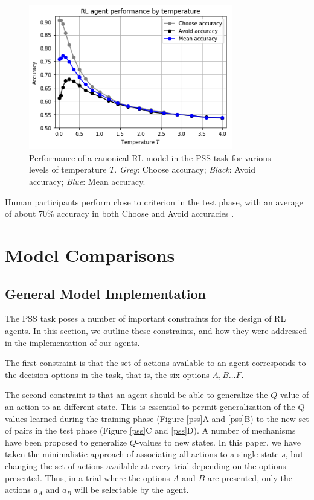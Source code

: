 \documentclass[10pt,letterpaper]{article}
\begin{document}
\begin{figure}[ht]
	\begin{center}
		\includegraphics[width=3.5in]{rl-performance.png}
	\end{center}
	\caption{Performance of a canonical RL model in the PSS task for various levels of temperature $T$. \emph{Grey}: Choose accuracy; \emph{Black}: Avoid accuracy; \emph{Blue}: Mean accuracy.} 
	\label{RL-agent-performance}
\end{figure}

Human participants perform close to criterion in the test phase, with an average of about 70\% accuracy in both Choose and Avoid accuracies \cite{frank2004carrot, frank2007genetic, stocco2017individual}.

\section{Model Comparisons}

\subsection{General Model Implementation}

The PSS task poses a number of important constraints for the design of RL agents. In this section, we outline these constraints, and how they were addressed in the implementation of our agents. 

The first constraint is that the set of actions available to an agent corresponds to the decision options in the task, that is, the six options $A, B \dots F$. 

The second constraint is that an agent should be able to generalize the $Q$ value of an action to an different state. This is essential to permit generalization of the $Q$-values learned during the training phase (Figure \ref{pss}A and \ref{pss}B) to the new set of pairs in the test phase (Figure \ref{pss}C and \ref{pss}D). A number of mechanisms have been proposed to generalize $Q$-values to new states. In this paper, we have taken the minimalistic approach of associating all actions to a single state $s$, but changing the set of actions available at every trial depending on the options presented. Thus, in a trial where the options $A$ and $B$ are presented, only the actions $a_A$ and $a_B$ will be selectable by the agent.
\end{document}
